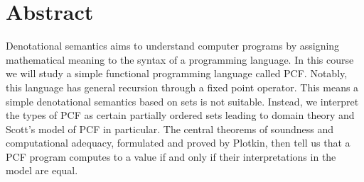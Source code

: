 \chapter{Abstract}

Denotational semantics aims to understand computer programs by assigning
mathematical meaning to the syntax of a programming language.
%
In this course we will study a simple functional programming language called
PCF. Notably, this language has general recursion through a fixed point
operator.
%
This means a simple denotational semantics based on sets is not
suitable. Instead, we interpret the types of PCF as certain partially ordered
sets leading to domain theory and Scott's model of PCF in particular.
%
The central theorems of soundness and computational adequacy, formulated and
proved by Plotkin, then tell us that a PCF program computes to a value if and
only if their interpretations in the model are equal.


